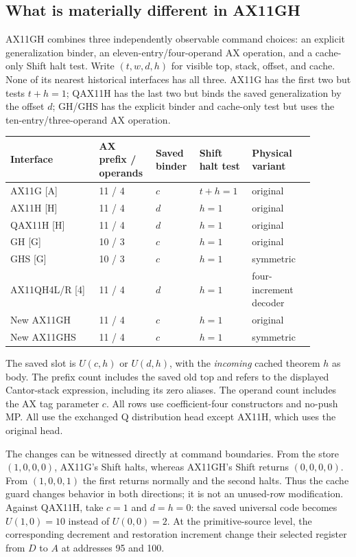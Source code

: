 \subsection{What is materially different in AX11GH}
\label{subsec:ax11gh-position}

AX11GH combines three independently observable command choices:
an explicit generalization binder, an eleven-entry/four-operand AX
operation, and a cache-only Shift halt test. Write $(t,w,d,h)$ for
visible top, stack, offset, and cache. None of its nearest
historical interfaces has all three. AX11G has the first two but tests
$t+h=1$; QAX11H has the last two but binds the saved generalization by
the offset $d$; GH/GHS has the explicit binder and cache-only test but
uses the ten-entry/three-operand AX operation.

\begin{center}\small
\setlength{\tabcolsep}{3pt}
\begin{tabular}{p{0.27\linewidth}p{0.14\linewidth}p{0.12\linewidth}p{0.16\linewidth}p{0.19\linewidth}}
\toprule
Interface & AX prefix / operands & Saved binder & Shift halt test & Physical variant\\
\midrule
AX11G [A] & 11 / 4 & $c$ & $t+h=1$ & original\\
AX11H [H] & 11 / 4 & $d$ & $h=1$ & original\\
QAX11H [H] & 11 / 4 & $d$ & $h=1$ & original\\
GH [G] & 10 / 3 & $c$ & $h=1$ & original\\
GHS [G] & 10 / 3 & $c$ & $h=1$ & symmetric\\
AX11QH4L/R [4] & 11 / 4 & $d$ & $h=1$ & four-increment decoder\\
\midrule
New AX11GH & 11 / 4 & $c$ & $h=1$ & original\\
New AX11GHS & 11 / 4 & $c$ & $h=1$ & symmetric\\
\bottomrule
\end{tabular}
\end{center}

The saved slot is $U(c,h)$ or $U(d,h)$, with the \emph{incoming}
cached theorem $h$ as body. The prefix count includes the saved old top
and refers to the displayed Cantor-stack expression, including its zero
aliases. The operand count includes the AX tag parameter $c$. All rows
use coefficient-four constructors and no-push MP. All use the exchanged
Q distribution head except AX11H, which uses the original head.

The changes can be witnessed directly at command boundaries. From the
store $(1,0,0,0)$, AX11G's Shift halts, whereas AX11GH's Shift
returns $(0,0,0,0)$. From $(1,0,0,1)$ the first returns normally and
the second halts. Thus the cache guard changes behavior in both
directions; it is not an unused-row modification. Against QAX11H, take
$c=1$ and $d=h=0$: the saved universal code becomes $U(1,0)=10$
instead of $U(0,0)=2$. At the primitive-source level, the corresponding
decrement and restoration increment change their selected register from
$D$ to $A$ at addresses 95 and 100.

